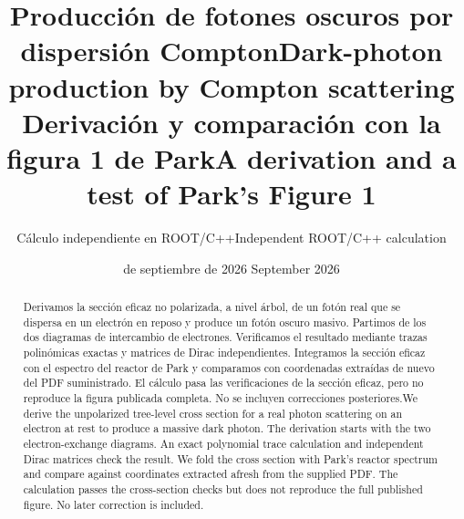 \usepackage[a4paper,margin=25mm]{geometry}
\usepackage{amsmath,amssymb,graphicx,booktabs,array,hyperref}
\ifspanish
\renewcommand{\abstractname}{Resumen}
\renewcommand{\refname}{Referencias}
\renewcommand{\figurename}{Figura}
\fi
\hypersetup{colorlinks=true,linkcolor=blue,urlcolor=blue,citecolor=blue}
\setlength{\parindent}{0pt}
\setlength{\parskip}{5pt}
\setlength{\emergencystretch}{2em}
\newcommand{\both}[2]{\ifspanish #2\else #1\fi}
\newcommand{\slsh}[1]{\not\!#1}
\newcommand{\Tr}{\operatorname{Tr}}
\newcommand{\dd}{\mathrm{d}}

\title{\both{Dark-photon production by Compton scattering}{Producción de fotones oscuros por dispersión Compton}\\[4pt]
\large\both{A derivation and a test of Park's Figure 1}{Derivación y comparación con la figura 1 de Park}}
\author{\both{Independent ROOT/C++ calculation}{Cálculo independiente en ROOT/C++}}
\date{\both{17 September 2026}{17 de septiembre de 2026}}

\maketitle
\begin{abstract}
\both{We derive the unpolarized tree-level cross section for a real photon scattering on an electron at rest to produce a massive dark photon. The derivation starts with the two electron-exchange diagrams. An exact polynomial trace calculation and independent Dirac matrices check the result. We fold the cross section with Park's reactor spectrum and compare against coordinates extracted afresh from the supplied PDF. The calculation passes the cross-section checks but does not reproduce the full published figure. No later correction is included.}
{Derivamos la sección eficaz no polarizada, a nivel árbol, de un fotón real que se dispersa en un electrón en reposo y produce un fotón oscuro masivo. Partimos de los dos diagramas de intercambio de electrones. Verificamos el resultado mediante trazas polinómicas exactas y matrices de Dirac independientes. Integramos la sección eficaz con el espectro del reactor de Park y comparamos con coordenadas extraídas de nuevo del PDF suministrado. El cálculo pasa las verificaciones de la sección eficaz, pero no reproduce la figura publicada completa. No se incluyen correcciones posteriores.}
\end{abstract}

